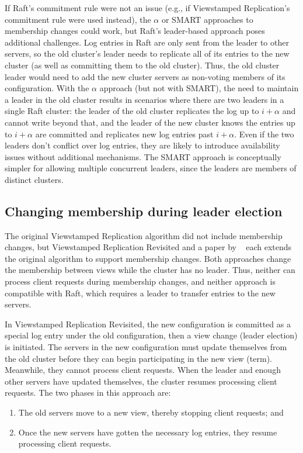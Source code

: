 If Raft's commitment rule were not an issue (e.g., if Viewstamped
Replication's commitment rule were used instead), the $\alpha$ or SMART
approaches to membership changes could work, but Raft's leader-based
approach poses additional challenges. Log entries in Raft are only sent
from the leader to other servers, so the old cluster's leader needs to
replicate all of its entries to the new cluster (as well as committing
them to the old cluster). Thus, the old cluster leader would need to add
the new cluster servers as non-voting members of its configuration.
With the $\alpha$ approach (but not with SMART), the need to maintain a
leader in the old cluster results in scenarios where there are two
leaders in a single Raft cluster: the leader of the old cluster
replicates the log up to $i + \alpha$ and cannot write beyond that, and
the leader of the new cluster knows the entries up to $i + \alpha$ are
committed and replicates new log entries past $i + \alpha$. Even if the
two leaders don't conflict over log entries, they are likely to
introduce availability issues without additional mechanisms. The SMART
approach is conceptually simpler for allowing multiple concurrent
leaders, since the leaders are members of distinct clusters.


\subsection{Changing membership during leader election}

The original Viewstamped Replication algorithm did not include
membership changes, but Viewstamped Replication Revisited and a paper by
\mazieres{}~\cite{Mazieres:2007} each extends the original algorithm to
support membership changes. Both approaches change the membership
between views while the
cluster has no leader. Thus, neither can process client requests during
membership changes, and neither approach is compatible with Raft, which
requires a leader to transfer entries to the new servers.

In Viewstamped Replication Revisited, the new configuration is committed
as a special
log entry under the old configuration, then a view change (leader
election) is initiated. The servers in the new configuration must update
themselves from the old cluster before they can begin participating in
the new view (term). Meanwhile, they cannot process client requests.
When the leader and enough other servers have updated themselves, the
cluster resumes processing client requests. The two phases in this
approach are:
%
\begin{enumerate}
%
\item The old servers move to a new view, thereby stopping client
requests; and
%
\item Once the new servers have gotten the necessary log entries, they
resume processing client requests.
%
\end{enumerate}

